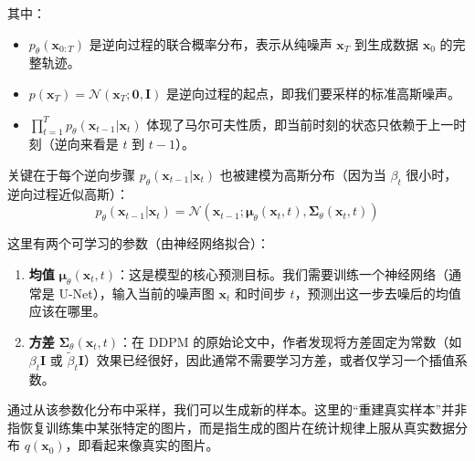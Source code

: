 \documentclass[zihao=-4, fontset=windows]{ctexart}
\begin{document}
其中：
\begin{itemize}
    \item $p_{\theta}(\mathbf{x}_{0: T})$ 是逆向过程的联合概率分布，表示从纯噪声 $\mathbf{x}_T$ 到生成数据 $\mathbf{x}_0$ 的完整轨迹。
    \item $p(\mathbf{x}_{T}) = \mathcal{N}(\mathbf{x}_{T}; \mathbf{0}, \mathbf{I})$ 是逆向过程的起点，即我们要采样的标准高斯噪声。
    \item $\prod_{t=1}^{T} p_{\theta}(\mathbf{x}_{t-1} | \mathbf{x}_{t})$ 体现了马尔可夫性质，即当前时刻的状态只依赖于上一时刻（逆向来看是 $t$ 到 $t-1$）。
\end{itemize}

关键在于每个逆向步骤 $p_{\theta}(\mathbf{x}_{t-1} | \mathbf{x}_{t})$ 也被建模为高斯分布（因为当 $\beta_t$ 很小时，逆向过程近似高斯）：
\begin{equation}
p_{\theta}(\mathbf{x}_{t-1} | \mathbf{x}_{t})=\mathcal{N}(\mathbf{x}_{t-1} ; \boldsymbol{\mu}_{\theta}(\mathbf{x}_{t}, t), \boldsymbol{\Sigma}_{\theta}(\mathbf{x}_{t}, t))
\end{equation}

这里有两个可学习的参数（由神经网络拟合）：
\begin{enumerate}
    \item \textbf{均值} $\boldsymbol{\mu}_{\theta}(\mathbf{x}_{t}, t)$：这是模型的核心预测目标。我们需要训练一个神经网络（通常是 U-Net），输入当前的噪声图 $\mathbf{x}_t$ 和时间步 $t$，预测出这一步去噪后的均值应该在哪里。
    \item \textbf{方差} $\boldsymbol{\Sigma}_{\theta}(\mathbf{x}_{t}, t)$：在 DDPM 的原始论文中，作者发现将方差固定为常数（如 $\beta_t \mathbf{I}$ 或 $\tilde{\beta}_t \mathbf{I}$）效果已经很好，因此通常不需要学习方差，或者仅学习一个插值系数。
\end{enumerate}

通过从该参数化分布中采样，我们可以生成新的样本。这里的“重建真实样本”并非指恢复训练集中某张特定的图片，而是指生成的图片在统计规律上服从真实数据分布 $q(\mathbf{x}_0)$，即看起来像真实的图片。
\end{document}
